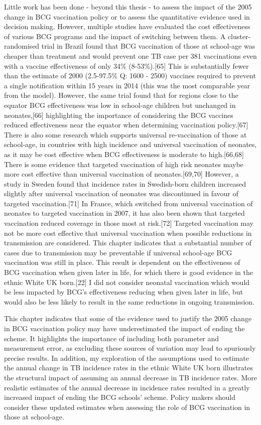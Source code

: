 \documentclass[11pt,twoside]{bristolthesis}
\begin{document}
  Little work has been done - beyond this thesis - to assess the impact of the 2005 change in BCG vaccination policy or to assess the quantitative evidence used in decision making. However, multiple studies have evaluated the cost effectiveness of various BCG programs and the impact of switching between them. A cluster-randomised trial in Brazil found that BCG vaccination of those at school-age was cheaper than treatment and would prevent one TB case per 381 vaccinations even with a vaccine effectiveness of only 34\% (8-53\%).{[}65{]} This is substantially fewer than the estimate of 2000 (2.5-97.5\% Q: 1600 - 2500) vaccines required to prevent a single notification within 15 years in 2014 (this was the most comparable year from the model). However, the same trial found that for regions close to the equator BCG effectiveness was low in school-age children but unchanged in neonates,{[}66{]} highlighting the importance of considering the BCG vaccines reduced effectiveness near the equator when determining vaccination policy.{[}67{]} There is also some research which supports universal re-vaccination of those at school-age, in countries with high incidence and universal vaccination of neonates, as it may be cost effective when BCG effectiveness is moderate to high.{[}66,68{]} There is some evidence that targeted vaccination of high risk neonates maybe more cost effective than universal vaccination of neonates.{[}69,70{]} However, a study in Sweden found that incidence rates in Swedish-born children increased slightly after universal vaccination of neonates was discontinued in favour of targeted vaccination.{[}71{]} In France, which switched from universal vaccination of neonates to targeted vaccination in 2007, it has also been shown that targeted vaccination reduced coverage in those most at risk.{[}72{]} Targeted vaccination may not be more cost effective that universal vaccination when possible reductions in transmission are considered. This chapter indicates that a substantial number of cases due to transmission may be preventable if universal school-age BCG vaccination was still in place. This result is dependent on the effectiveness of BCG vaccination when given later in life, for which there is good evidence in the ethnic White UK born.{[}22{]} I did not consider neonatal vaccination which would be less impacted by BCG's effectiveness reducing when given later in life, but would also be less likely to result in the same reductions in ongoing transmission.
  
  This chapter indicates that some of the evidence used to justify the 2005 change in BCG vaccination policy may have underestimated the impact of ending the scheme. It highlights the importance of including both parameter and measurement error, as excluding these sources of variation may lead to spuriously precise results. In addition, my exploration of the assumptions used to estimate the annual change in TB incidence rates in the ethnic White UK born illustrates the structural impact of assuming an annual decrease in TB incidence rates. More realistic estimates of the annual decrease in incidence rates resulted in a greatly increased impact of ending the BCG schools' scheme. Policy makers should consider these updated estimates when assessing the role of BCG vaccination in those at school-age.
  
\end{document}
